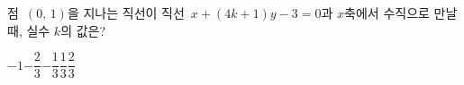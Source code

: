 점~$(0,\,1)$을 지나는 직선이 직선~$x+(4k+1)y-3=0$과 $x$축에서 수직으로 만날 때, 실수 $k$의 값은?
\begin{choices32}{$-1$}{$-\dfrac{2}{3}$}{$-\dfrac{1}{3}$}{$\dfrac{1}{3}$}{$\dfrac{2}{3}$}\end{choices32}
